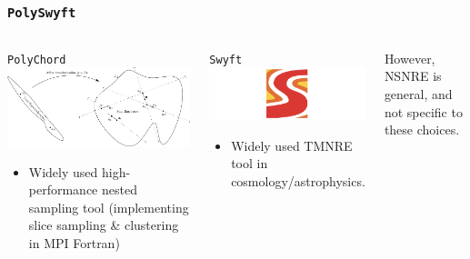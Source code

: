 \documentclass[aspectratio=169]{beamer}
\begin{document}
\begin{frame}
    \frametitle{\texttt{PolySwyft}}
    \begin{columns}[t]
        \begin{block}{\texttt{PolyChord}}
            \includegraphics[width=\textwidth]{figures/polychord.png}
            \begin{itemize}
                \item Widely used high-performance nested sampling tool (implementing slice sampling \& clustering in MPI Fortran)
            \end{itemize}
        \end{block}
        \begin{block}{\texttt{Swyft}}
            \includegraphics[width=\textwidth]{figures/swyft_logo_wide.png}
            \begin{itemize}
                \item Widely used TMNRE tool in cosmology/astrophysics.
            \end{itemize}
        \end{block}
        However, NSNRE is general, and not specific to these choices.
    \end{columns}
\end{frame}
\end{document}
